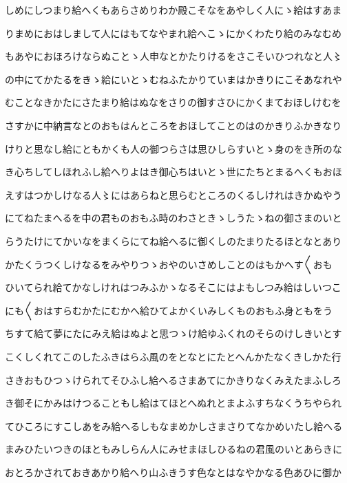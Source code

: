 \documentclass[a4paper,11pt,landscape]{ltjtarticle}
\begin{document}
しめにしつまり給へくもあらさめりわか殿こそなをあやしく人にゝ給はすあま
\par\medskip
りまめにおはしまして人にはもてなやまれ給へこゝにかくわたり給のみなむめ
\par\medskip
もあやにおほろけならぬことゝ人申なとかたりけるをさこそいひつれなと人〻
\par\medskip
の中にてかたるをきゝ給にいとゝむねふたかりていまはかきりにこそあなれや
\par\medskip
むことなきかたにさたまり給はぬなをさりの御すさひにかくまておほしけむを
\par\medskip
さすかに中納言なとのおもはんところをおほしてことのはのかきりふかきなり
\par\medskip
けりと思なし給にともかくも人の御つらさは思ひしらすいとゝ身のをき所のな
\par\medskip
き心ちしてしほれふし給へりよはき御心ちはいとゝ世にたちとまるへくもおほ
\par\medskip
えすはつかしけなる人〻にはあらねと思らむところのくるしけれはきかぬやう
\par\medskip
にてねたまへるを中の君ものおもふ時のわさときゝしうたゝねの御さまのいと
\par\medskip
らうたけにてかいなをまくらにてね給へるに御くしのたまりたるほとなとあり
\par\medskip
かたくうつくしけなるをみやりつゝおやのいさめしことのはもかへす〱おも
\par\medskip
ひいてられ給てかなしけれはつみふかゝなるそこにはよもしつみ給はしいつこ
\par\medskip
にも〱おはすらむかたにむかへ給ひてよかくいみしくものおもふ身ともをう
\par\medskip
ちすて給て夢にたにみえ給はぬよと思つゝけ給ゆふくれのそらのけしきいとす
\par\medskip
こくしくれてこのしたふきはらふ風のをとなとにたとへんかたなくきしかた行
\par\medskip
さきおもひつゝけられてそひふし給へるさまあてにかきりなくみえたまふしろ
\par\medskip
き御そにかみはけつることもし給はてほとへぬれとまよふすちなくうちやられ
\par\medskip
てひころにすこしあをみ給へるしもなまめかしさまさりてなかめいたし給へる
\par\medskip
まみひたいつきのほともみしらん人にみせまほしひるねの君風のいとあらきに
\par\medskip
おとろかされておきあかり給へり山ふきうす色なとはなやかなる色あひに御か
\par\medskip
\end{document}
